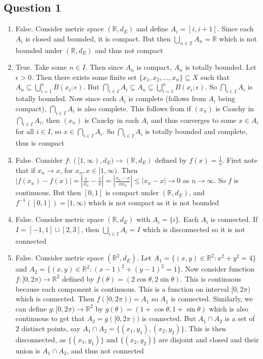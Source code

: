 \documentclass[letterpaper, 11pt]{article}
\newcommand{\R}{\mathbb{R}}   %
\newcommand{\Z}{\mathbb{Z}}   %
\newcommand{\1}{\mathds{1}}	%
\theoremstyle{definition}
\begin{document}
\subsection*{Question 1}

\begin{enumerate}[label=(\alph*)]
\item False. Consider metric space $(\R, d_E)$ and define $A_i = [i, i+1]$. Since each $A_i$ is closed and bounded, it is compact. But then $\bigcup _{n \in \Z} A_n = \R$ which is not bounded under $(\R, d_E)$ and thus not compact

\item True.  Take some $n \in I$. Then since $A_n$ is compact, $A_n$ is totally bounded. Let $\epsilon > 0$. Then there exists some finite set $\{x_1, x_2, ..., x_n\} \subseteq X$ such that $A_n \subseteq \bigcup _{i=1} ^n B(x_i; \epsilon)$. But $\bigcap _{i \in I}A_i \subseteq A_n \subseteq \bigcup _{i=1} ^n B(x_i; \epsilon)$. So $\bigcap _{i \in I}A_i$ is totally bounded. Now since each $A_i$ is complete (follows from $A_i$ being compact),  $\bigcap _{i \in I}A_i$ is also complete. This follows from if $(x_n)$ is Cauchy in $\bigcap _{i \in I}A_i$, then $(x_n)$ is Cauchy in each $A_i$ and thus converges to some $x \in A_i$ for all $i \in I$, so $x \in \bigcap _{i \in I}A_i$. So  $\bigcap _{i \in I}A_i$ is totally bounded and complete, thus is compact

\item False. Consider $f: ([1, \infty), d_E) \to (\R, d_E)$ defined by $f(x) = \frac{1}{x}$. First note that if $x_n \to x$, for $x_n, x \in [1, \infty)$. Then $|f(x_n) - f(x)| = |\frac{1}{x_n} - \frac{1}{x}| = |\frac{x_n - x}{xx_n}| \le |x_n - x| \to 0$ as $n \to \infty$. So $f$ is continuous. But then $[0, 1]$ is compact under $(\R, d_E)$, and $f^{-1}([0,1]) = [1, \infty)$ which is not compact as it is not bounded

\item False. Consider metric space $(\R, d_E)$ with $A_i = \{i\}$. Each $A_i$ is connected. If $I = [-1,1] \cup [2,3]$, then $\bigcup _{i \in I}A_i = I$ which is disconnected so it is not connected

\item False. Consider metric space $(\R ^2, d_E)$. Let $A_1 = \{(x,y) \in \R ^2 : x^2 + y^2 = 4\}$ and $A_2 = \{(x,y) \in \R ^2 : (x-1)^2 + (y-1)^2 = 1\}$. Now consider function $f: [0, 2\pi) \to \R^2$ defined by $f(\theta) = (2\cos \theta , 2\sin \theta)$. This is continuous because each component is continuous. This is a function on interval $[0, 2 \pi )$ which is connected. Then $f([0, 2 \pi)) = A_1$ so $A_1$ is connected. Similarly, we can define $g: [0, 2\pi) \to \R^2$ by $g(\theta) = (1+\cos \theta  , 1+\sin \theta )$ which is also continuous to get that $A_2 = g([0, 2 \pi ))$ is connected. But $A_1 \cap A_2 $ is a set of 2 distinct points, say $A_1 \cap A_2 = \{(x_1, y_1), (x_2, y_2)\}$. This is then disconnected, as $\{(x_1, y_1)\}$ and $\{(x_2, y_2)\}$ are disjoint and closed and their union is $A_1 \cap A_2$, and thus not connected

\end{enumerate}
\newpage
\end{document}
